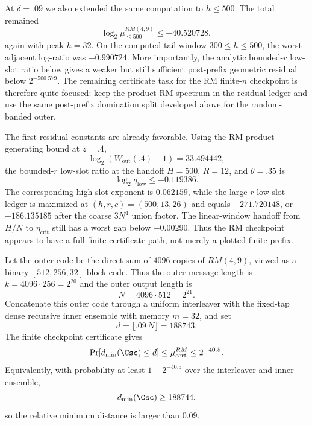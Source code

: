 At \(\delta=.09\) we also extended the same computation to \(h\le500\).  The total remained
\[
\log_2\mu_{\le500}^{RM(4,9)}\le -40.520728,
\]
again with peak \(h=32\).  On the computed tail window \(300\le h\le500\), the worst adjacent log-ratio was
\(-0.990724\).  More importantly, the analytic bounded-\(r\) low-slot ratio below gives a weaker but still sufficient
post-prefix geometric residual below \(2^{-500.579}\).  The remaining certificate task for the RM finite-\(n\)
checkpoint is therefore quite focused: keep the product RM spectrum in the residual ledger and use the same
post-prefix domination split developed above for the random-banded outer.

The first residual constants are already favorable.  Using the RM product generating bound at \(z=.4\),
\[
\log_2(W_{\mathrm{out}}(.4)-1)=33.494442,
\]
the bounded-\(r\) low-slot ratio at the handoff \(H=500\), \(R=12\), and \(\theta=.35\) is
\[
\log_2 q_{\mathrm{low}}\le -0.119386.
\]
The corresponding high-slot exponent is \(0.062159\), while the large-\(r\) low-slot ledger is maximized at
\((h,r,c)=(500,13,26)\) and equals \(-271.720148\), or \(-186.135185\) after the coarse \(3N^4\) union factor.  The
linear-window handoff from \(H/N\) to \(\eta_{\mathrm{crit}}\) still has a worst gap below \(-0.00290\).  Thus the
RM checkpoint appears to have a full finite-certificate path, not merely a plotted finite prefix.

\begin{theorem}
\label{thm:finite-rm-block-checkpoint-009}
Let the outer code be the direct sum of \(4096\) copies of \(RM(4,9)\), viewed as a binary
\([512,256,32]\) block code.  Thus the outer message length is \(k=4096\cdot256=2^{20}\) and the
outer output length is
\[
N=4096\cdot512=2^{21}.
\]
Concatenate this outer code through a uniform interleaver with the fixed-tap dense recursive inner ensemble with
memory \(m=32\), and set
\[
d=\lfloor .09\,N\rfloor=188743.
\]
The finite checkpoint certificate gives
\[
\Pr[d_{\min}(\Csc)\le d]
\le
\mu_{\mathrm{cert}}^{RM}
\le
2^{-40.5}.
\]
Equivalently, with probability at least \(1-2^{-40.5}\) over the interleaver and inner ensemble,
\[
d_{\min}(\Csc)\ge188744,
\]
so the relative minimum distance is larger than \(0.09\).
\end{theorem}

